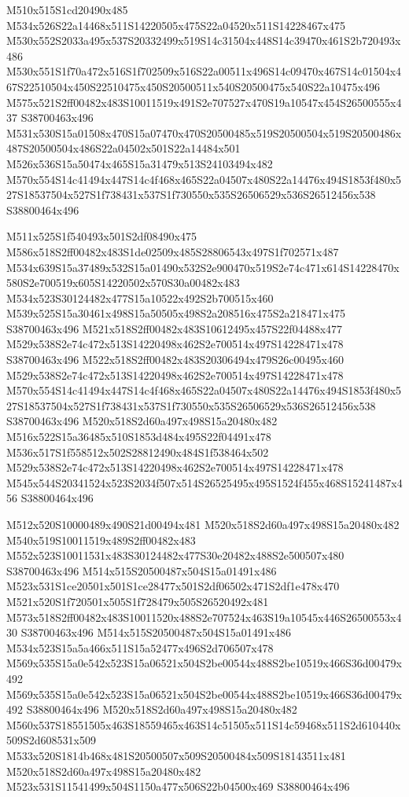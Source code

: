 \documentclass{article}
\begin{document}
\begin{multicols}{2}
M510x515S1cd20490x485 M534x526S22a14468x511S14220505x475S22a04520x511S14228467x475 M530x552S2033a495x537S20332499x519S14c31504x448S14c39470x461S2b720493x486 M530x551S1f70a472x516S1f702509x516S22a00511x496S14c09470x467S14c01504x467S22510504x450S22510475x450S20500511x540S20500475x540S22a10475x496 M575x521S2ff00482x483S10011519x491S2e707527x470S19a10547x454S26500555x437 S38700463x496 M531x530S15a01508x470S15a07470x470S20500485x519S20500504x519S20500486x487S20500504x486S22a04502x501S22a14484x501 M526x536S15a50474x465S15a31479x513S24103494x482 M570x554S14c41494x447S14c4f468x465S22a04507x480S22a14476x494S1853f480x527S18537504x527S1f738431x537S1f730550x535S26506529x536S26512456x538 S38800464x496

M511x525S1f540493x501S2df08490x475 M586x518S2ff00482x483S1de02509x485S28806543x497S1f702571x487 M534x639S15a37489x532S15a01490x532S2e900470x519S2e74c471x614S14228470x580S2e700519x605S14220502x570S30a00482x483 M534x523S30124482x477S15a10522x492S2b700515x460 M539x525S15a30461x498S15a50505x498S2a208516x475S2a218471x475 S38700463x496 M521x518S2ff00482x483S10612495x457S22f04488x477 M529x538S2e74c472x513S14220498x462S2e700514x497S14228471x478 S38700463x496 M522x518S2ff00482x483S20306494x479S26c00495x460 M529x538S2e74c472x513S14220498x462S2e700514x497S14228471x478 M570x554S14c41494x447S14c4f468x465S22a04507x480S22a14476x494S1853f480x527S18537504x527S1f738431x537S1f730550x535S26506529x536S26512456x538 S38700463x496 M520x518S2d60a497x498S15a20480x482 M516x522S15a36485x510S1853d484x495S22f04491x478 M536x517S1f558512x502S28812490x484S1f538464x502 M529x538S2e74c472x513S14220498x462S2e700514x497S14228471x478 M545x544S20341524x523S2034f507x514S26525495x495S1524f455x468S15241487x456 S38800464x496

M512x520S10000489x490S21d00494x481 M520x518S2d60a497x498S15a20480x482 M540x519S10011519x489S2ff00482x483 M552x523S10011531x483S30124482x477S30e20482x488S2e500507x480 S38700463x496 M514x515S20500487x504S15a01491x486 M523x531S1ce20501x501S1ce28477x501S2df06502x471S2df1e478x470 M521x520S1f720501x505S1f728479x505S26520492x481 M573x518S2ff00482x483S10011520x488S2e707524x463S19a10545x446S26500553x430 S38700463x496 M514x515S20500487x504S15a01491x486 M534x523S15a5a466x511S15a52477x496S2d706507x478 M569x535S15a0e542x523S15a06521x504S2be00544x488S2be10519x466S36d00479x492 M569x535S15a0e542x523S15a06521x504S2be00544x488S2be10519x466S36d00479x492 S38800464x496 M520x518S2d60a497x498S15a20480x482 M560x537S18551505x463S18559465x463S14c51505x511S14c59468x511S2d610440x509S2d608531x509 M533x520S1814b468x481S20500507x509S20500484x509S18143511x481 M520x518S2d60a497x498S15a20480x482 M523x531S11541499x504S1150a477x506S22b04500x469 S38800464x496


\end{multicols}
\end{document}
